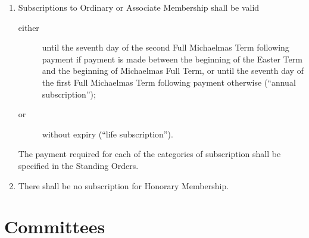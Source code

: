 \documentclass{article}
\begin{document}
\begin{enumerate}
\item Subscriptions to Ordinary or Associate Membership shall be valid
\begin{description}
\item[either] until the seventh day of the second Full Michaelmas Term following
payment if payment is made between the beginning of the Easter
Term and the beginning of Michaelmas Full Term, or until the seventh
day of the first Full Michaelmas Term following payment otherwise
(``annual subscription'');
\item[or] without expiry (``life subscription'').
\end{description}
The payment required for each of the categories of subscription shall be
specified in the Standing Orders.
\item There shall be no subscription for Honorary Membership.
\end{enumerate}


\section{Committees}
\label{committees}
\end{document}
